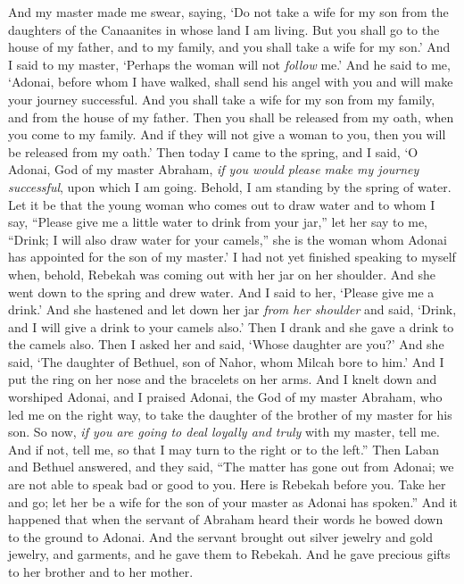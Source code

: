 \begin{biblechapter}
\verse And my master made me swear, saying, ‘Do not take a wife for my son from the daughters of the Canaanites in whose land I am living.
\verse But you shall go to the house of my father, and to my family, and you shall take a wife for my son.’
\verse And I said to my master, ‘Perhaps the woman will not \textit{follow} me.’
\verse And he said to me, ‘Adonai, before whom I have walked, shall send his angel with you and will make your journey successful. And you shall take a wife for my son from my family, and from the house of my father.
\verse Then you shall be released from my oath, when you come to my family. And if they will not give a woman to you, then you will be released from my oath.’
\verse Then today I came to the spring, and I said, ‘O Adonai, God of my master Abraham, \textit{if you would please make my journey successful}, upon which I am going.
\verse Behold, I am standing by the spring of water. Let it be that the young woman who comes out to draw water and to whom I say, “Please give me a little water to drink from your jar,”
\verse let her say to me, “Drink; I will also draw water for your camels,” she is the woman whom Adonai has appointed for the son of my master.’
\verse I had not yet finished speaking to myself when, behold, Rebekah was coming out with her jar on her shoulder. And she went down to the spring and drew water. And I said to her, ‘Please give me a drink.’
\verse And she hastened and let down her jar \textit{from her shoulder} and said, ‘Drink, and I will give a drink to your camels also.’ Then I drank and she gave a drink to the camels also.
\verse Then I asked her and said, ‘Whose daughter are you?’ And she said, ‘The daughter of Bethuel, son of Nahor, whom Milcah bore to him.’ And I put the ring on her nose and the bracelets on her arms.
\verse And I knelt down and worshiped Adonai, and I praised Adonai, the God of my master Abraham, who led me on the right way, to take the daughter of the brother of my master for his son.
\verse So now, \textit{if you are going to deal loyally and truly} with my master, tell me. And if not, tell me, so that I may turn to the right or to the left.”
\verse Then Laban and Bethuel answered, and they said, “The matter has gone out from Adonai; we are not able to speak bad or good to you.
\verse Here is Rebekah before you. Take her and go; let her be a wife for the son of your master as Adonai has spoken.”
\verse And it happened that when the servant of Abraham heard their words he bowed down to the ground to Adonai.
\verse And the servant brought out silver jewelry and gold jewelry, and garments, and he gave them to Rebekah. And he gave precious gifts to her brother and to her mother.

\end{biblechapter}
